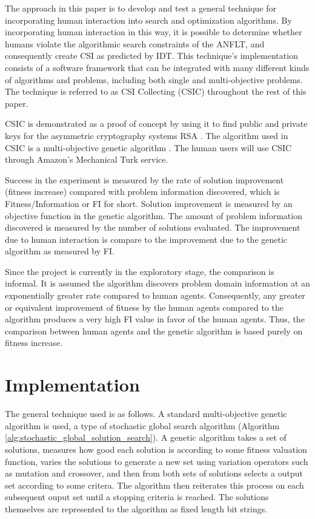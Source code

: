The approach in this paper is to develop and test a general technique for incorporating human interaction into search and optimization algorithms.  By incorporating human interaction in this way, it is possible to determine whether humans violate the algorithmic search constraints of the ANFLT, and consequently create CSI as predicted by IDT.  This technique's implementation consists of a software framework that can be integrated with many different kinds of algorithms and problems, including both single and multi-objective problems.  The technique is referred to as CSI Collecting (CSIC) throughout the rest of this paper.

CSIC is demonstrated as a proof of concept by using it to find public and private keys for the asymmetric cryptography systems RSA \cite{cormen01:_introd_to_algor}.  The algorithm used in CSIC is a multi-objective genetic algorithm \cite{coello07:_evolut_algor_for_solvin_multi_objec_probl}.  The human users will use CSIC through Amazon's Mechanical Turk service.  

Success in the experiment is measured by the rate of solution improvement (fitness increase) compared with problem information discovered, which is Fitness/Information or FI for short.  Solution improvement is measured by an objective function in the genetic algorithm.  The amount of problem information discovered is measured by the number of solutions evaluated.  The improvement due to human interaction is compare to the improvement due to the genetic algorithm as measured by FI.  

Since the project is currently in the exploratory stage, the comparison is informal.  It is assumed the algorithm discovers problem domain information at an exponentially greater rate compared to human agents.  Consequently, any greater or equivalent improvement of fitness by the human agents compared to the algorithm produces a very high FI value in favor of the human agents.  Thus, the comparison between human agents and the genetic algorithm is based purely on fitness increase.

\section{Implementation}
The general technique used is as follows.  A standard multi-objective genetic algorithm is used, a type of stochastic global search algorithm (Algorithm \ref{alg:stochastic_global_solution_search}).  A genetic algorithm takes a set of solutions, measures how good each solution is according to some fitness valuation function, varies the solutions to generate a new set using variation operators such as mutation and crossover, and then from both sets of solutions selects a output set according to some critera.  The algorithm then reiterates this process on each subsequent ouput set until a stopping criteria is reached.  The solutions themselves are represented to the algorithm as fixed length bit strings.  

